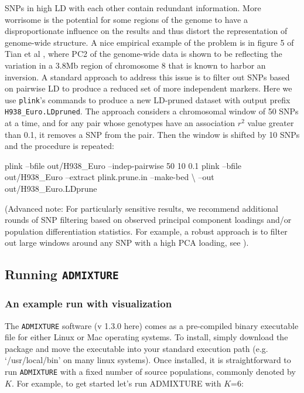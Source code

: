 \documentclass{svmult}       %
\newenvironment{Shaded}{\begin{snugshade}}{\end{snugshade}}
\newcommand{\ExtensionTok}[1]{#1}
\newcommand{\NormalTok}[1]{#1}
\begin{document}
SNPs in high LD with each other contain redundant information. More
worrisome is the potential for some regions of the genome to have a
disproportionate influence on the results and thus distort the
representation of genome-wide structure. A nice empirical example of the
problem is in figure 5 of Tian et al \cite{Tian2008aa}, where PC2 of
the genome-wide data is shown to be reflecting the variation in a 3.8Mb
region of chromosome 8 that is known to harbor an inversion. A standard
approach to address this issue is to filter out SNPs based on pairwise
LD to produce a reduced set of more independent markers. Here we use
\texttt{plink}'s commands to produce a new LD-pruned dataset with output
prefix \texttt{H938\_Euro.LDpruned}. The approach considers a
chromosomal window of 50 SNPs at a time, and for any pair whose
genotypes have an association \(r^2\) value greater than 0.1, it removes
a SNP from the pair. Then the window is shifted by 10 SNPs and the
procedure is repeated:

\begin{Shaded}
\begin{Highlighting}[]
\ExtensionTok{plink}\NormalTok{ --bfile out/H938_Euro --indep-pairwise 50 10 0.1}
\ExtensionTok{plink}\NormalTok{ --bfile out/H938_Euro --extract plink.prune.in --make-bed \textbackslash{}}
\NormalTok{--out out/H938_Euro.LDprune}
\end{Highlighting}
\end{Shaded}

(Advanced note: For particularly sensitive results, we recommend
additional rounds of SNP filtering based on observed principal component
loadings and/or population differentiation statistics. For example, a
robust approach is to filter out large windows around any SNP with a
high PCA loading, see \cite{Novembre08a}).

\subsection{\texorpdfstring{Running
\texttt{ADMIXTURE}}{Running ADMIXTURE}}\label{running-admixture}

\subsubsection{An example run with
visualization}\label{an-example-run-with-visualization}

The \texttt{ADMIXTURE} software (v 1.3.0 here) comes as a pre-compiled
binary executable file for either Linux or Mac operating systems. To
install, simply download the package and move the executable into your
standard execution path (e.g. `/usr/local/bin' on many linux systems).
Once installed, it is straightforward to run \texttt{ADMIXTURE} with a
fixed number of source populations, commonly denoted by \(K\). For
example, to get started let's run ADMIXTURE with \(K\)=6:
\end{document}
